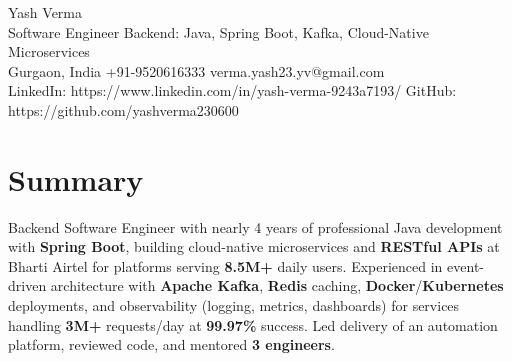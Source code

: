 \documentclass[letterpaper,11pt]{article}
\begin{document}
\begin{center}
  {\Huge Yash Verma} \\
  \small Software Engineer \textbar{} Backend: Java, Spring Boot, Kafka, Cloud-Native Microservices \\
  \small Gurgaon, India \textbar{} +91-9520616333 \textbar{} verma.yash23.yv@gmail.com \\
  LinkedIn: https://www.linkedin.com/in/yash-verma-9243a7193/ \textbar{} GitHub: https://github.com/yashverma230600
  \vspace{-8pt}
\end{center}

\section{Summary}
\begin{itemize}[leftmargin=0.15in, label={}]
  \small{\item{
    Backend Software Engineer with nearly 4 years of professional Java development with \textbf{Spring Boot}, building cloud-native microservices and \textbf{RESTful APIs} at Bharti Airtel for platforms serving \textbf{8.5M+} daily users. Experienced in event-driven architecture with \textbf{Apache Kafka}, \textbf{Redis} caching, \textbf{Docker}/\textbf{Kubernetes} deployments, and observability (logging, metrics, dashboards) for services handling \textbf{3M+} requests/day at \textbf{99.97\%} success. Led delivery of an automation platform, reviewed code, and mentored \textbf{3 engineers}.
  }}
\end{itemize}
\vspace{-8pt}

\end{document}
